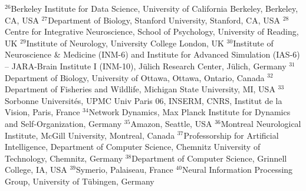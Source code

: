 $^{26}$Berkeley Institute for Data Science, University of California Berkeley, Berkeley, CA, USA
$^{27}$Department of Biology, Stanford University, Stanford, CA, USA
$^{28}$Centre for Integrative Neuroscience, School of Psychology, University of Reading, UK
$^{29}$Institute of Neurology, University College London, UK
$^{30}$Institute of Neuroscience \& Medicine (INM-6) and Institute for Advanced Simulation (IAS-6) -- JARA-Brain Institute I (INM-10), Jülich Research Center, Jülich, Germany
$^{31}$Department of Biology, University of Ottawa, Ottawa, Ontario, Canada
$^{32}$Department of Fisheries and Wildlife, Michigan State University, MI, USA
$^{33}$Sorbonne Universités, UPMC Univ Paris 06, INSERM, CNRS, Institut de la Vision, Paris, France
$^{34}$Network Dynamics, Max Planck Institute for Dynamics and Self-Organization, Germany
$^{35}$Amazon, Seattle, USA
$^{36}$Montreal Neurological Institute, McGill University, Montreal, Canada
$^{37}$Professorship for Artificial Intelligence, Department of Computer Science, Chemnitz University of Technology, Chemnitz, Germany
$^{38}$Department of Computer Science, Grinnell College, IA, USA
$^{39}$Symerio, Palaiseau, France
$^{40}$Neural Information Processing Group, University of Tübingen, Germany
\par